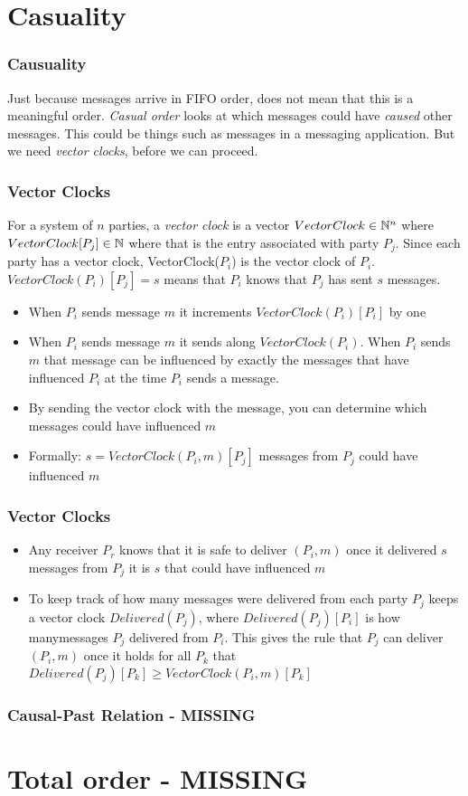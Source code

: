 \section{Casuality}
    \begin{frame}
        \frametitle{Causuality}
            Just because messages arrive in FIFO order, does not mean that this is a meaningful order. \textit{Casual order} looks at which messages could have \textit{caused} other messages. This could be things such as messages in a messaging application. But we need \textit{vector clocks}, before we can proceed. 
    \end{frame}
    \begin{frame}
        \frametitle{Vector Clocks}
            For a system of $n$ parties, a \textit{vector clock} is a vector $VectorClock \in \mathbb{N}^n$ where $VectorClock[P_j] \in \mathbb{N}$ where that is the entry associated with party $P_j$. Since each party has a vector clock, VectorClock($P_i$) is the vector clock of $P_i$.
            $VectorClock(P_i)[P_j] = s$ means that $P_i$ knows that $P_j$ has sent $s$ messages. 
            \begin{itemize}
                \item When $P_i$ sends message $m$ it increments $VectorClock(P_i)[P_i]$ by one
                \item When $P_i$ sends message $m$ it sends along $VectorClock(P_i)$. When $P_i$ sends $m$ that message can be influenced by exactly the messages that have influenced $P_i$ at the time $P_i$ sends a message. 
                \item By sending the vector clock with the message, you can determine which messages could have influenced $m$
                \item Formally: $s = VectorClock(P_i, m)[P_j]$ messages from $P_j$ could have influenced $m$
            \end{itemize}
    \end{frame}

    \begin{frame}
        \frametitle{Vector Clocks}
            \begin{itemize}
                \item Any receiver $P_r$ knows that it is safe to deliver $(P_i, m)$ once it delivered $s$ messages from $P_j$ it is $s$ that could have influenced $m$
                \item To keep track of how many messages were delivered from each party $P_j$ keeps a vector clock $Delivered(P_j)$, where $Delivered(P_j)[P_i]$ is how manymessages $P_j$ delivered from $P_i$. This gives the rule that $P_j$ can deliver $(P_i, m)$ once it holds for all $P_k$ that $Delivered(P_j)[P_k] \geq VectorClock(P_i, m)[P_k]$
            \end{itemize}
    \end{frame}

    \begin{frame}
        \frametitle{Causal-Past Relation - MISSING}
                
        
    
    \end{frame}
\section{Total order - MISSING}



